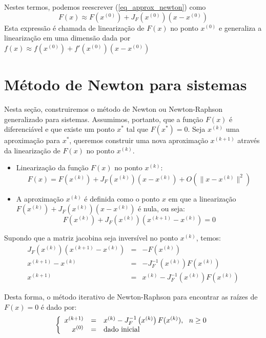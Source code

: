 Nestes termos, podemos reescrever (\ref{eq_approx_newton}) como
$$F(x)\approx F(x^{(0)}) + J_F(x^{(0)}) (x-x^{(0)})$$
Esta expressão é chamada de linearização de $F(x)$ no ponto $x^{(0)}$ e generaliza a linearização em uma dimensão dada por $f(x)\approx f(x^{(0)})+f'(x^{(0)}) (x-x^{(0)})$



\section{Método de  Newton para sistemas}
Nesta seção, construiremos o método de Newton ou Newton-Raphson generalizado para sistemas. Assumimos, portanto, que a função $F(x)$ é diferenciável e que existe um ponto $x^*$ tal que $F(x^*)=0$. Seja $x^{(k)}$ uma aproximação para $x^*$, queremos construir uma nova aproximação $x^{(k+1)}$ através da linearização de $F(x)$ no ponto $x^{(k)}$.

\begin{itemize}
\item Linearização da função $F(x)$ no ponto $x^{(k)}$: 
  \begin{equation*}
F(x)= F(x^{(k)})+ J_F\left(x^{(k)}\right) \left(x-x^{(k)}\right)  + O\left(\|x-x^{(k)}\|^2\right)    
  \end{equation*}
\item A aproximação $x^{(k)}$ é definida como o ponto $x$ em que a linearização $F(x^{(k)})+ J_F\left(x^{(k)}\right) \left(x-x^{(k)}\right)$ é nula, ou seja:
$$F(x^{(k)})+ J_F\left(x^{(k)}\right) \left(x^{(k+1)}-x^{(k)}\right)=0$$
\end{itemize}

Supondo que a matriz jacobina seja inversível no ponto $x^{(k)}$, temos:
\begin{eqnarray*}
J_F\left(x^{(k)}\right) \left(x^{(k+1)}-x^{(k)}\right)&=&-F(x^{(k)})\\
x^{(k+1)}-x^{(k)}&=&-J_F^{-1}\left(x^{(k)}\right)F(x^{(k)})\\
x^{(k+1)}&=&x^{(k)}-J_F^{-1}\left(x^{(k)}\right)F(x^{(k)})
\end{eqnarray*}

Desta forma, o método iterativo de Newton-Raphson para encontrar as raízes de $F(x)=0$ é dado por:
\begin{equation*}
\left\{\begin{array}{rcl}
x^{(k+1)} &=& x^{(k)}-J_F^{-1}\left(x^{(k)}\right)F(x^{(k)}),~~ n\geq 0\\
x^{(0)}&=&\hbox{dado inicial}
\end{array}\right.  
\end{equation*}

